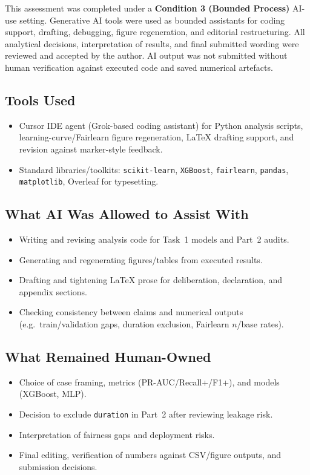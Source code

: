 This assessment was completed under a \textbf{Condition 3 (Bounded Process)} AI-use
setting. Generative AI tools were used as bounded assistants for coding support,
drafting, debugging, figure regeneration, and editorial restructuring. All analytical
decisions, interpretation of results, and final submitted wording were reviewed and
accepted by the author. AI output was not submitted without human verification against
executed code and saved numerical artefacts.

\subsection{Tools Used}
\begin{itemize}
    \item Cursor IDE agent (Grok-based coding assistant) for Python analysis scripts,
    learning-curve/Fairlearn figure regeneration, LaTeX drafting support, and revision
    against marker-style feedback.
    \item Standard libraries/toolkits: \texttt{scikit-learn}, \texttt{XGBoost},
    \texttt{fairlearn}, \texttt{pandas}, \texttt{matplotlib}, Overleaf for typesetting.
\end{itemize}

\subsection{What AI Was Allowed to Assist With}
\begin{itemize}
    \item Writing and revising analysis code for Task~1 models and Part~2 audits.
    \item Generating and regenerating figures/tables from executed results.
    \item Drafting and tightening LaTeX prose for deliberation, declaration, and
    appendix sections.
    \item Checking consistency between claims and numerical outputs (e.g.\ train/validation
    gaps, duration exclusion, Fairlearn $n$/base rates).
\end{itemize}

\subsection{What Remained Human-Owned}
\begin{itemize}
    \item Choice of case framing, metrics (PR-AUC/Recall+/F1+), and models (XGBoost, MLP).
    \item Decision to exclude \texttt{duration} in Part~2 after reviewing leakage risk.
    \item Interpretation of fairness gaps and deployment risks.
    \item Final editing, verification of numbers against CSV/figure outputs, and
    submission decisions.
\end{itemize}


